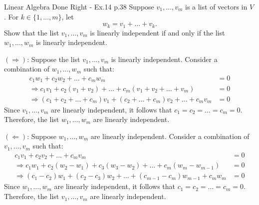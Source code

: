 \begin{problem}{}{}{Linear Algebra Done Right - Ex.14 p.38}
Suppose $v_1, \dots, v_m$ is a list of vectors in $V$.
For $k \in \{1, \dots, m\}$, let
$$w_k = v_1 + \dots + v_k.$$
Show that the list $v_1, \dots, v_m$ is linearly independent
if and only if the list $w_1, \dots, w_m$ is linearly independent.
\end{problem}

\begin{solution}
    $(\Rightarrow)$: Suppose the list $v_1, \dots, v_m$ is linearly independent.
    Consider a combination of $w_1, \dots, w_m$ such that:
    \begin{align*}
        c_1 w_1 + c_2 w_2 + \dots + c_m w_m                                       & = 0 \\
        \Rightarrow c_1 v_1 + c_2(v_1+v_2) + \dots + c_m(v_1+v_2+\dots+v_m)       & = 0 \\
        \Rightarrow (c_1+c_2+\dots+c_m)v_1 + (c_2+\dots+c_m)v_2 + \dots + c_m v_m & = 0
    \end{align*}
    Since $v_1, \dots, v_m$ are linearly independent, it follows that
    $c_1 = c_2 = \dots = c_m = 0$.
    Therefore, the list $w_1, \dots, w_m$ are linearly independent.

    $(\Leftarrow)$: Suppose $w_1, \dots, w_m$ are linearly independent.
    Consider a combination of $v_1, \dots, v_m$ such that:
    \begin{align*}
        c_1 v_1 + c_2 v_2 + \dots + c_m v_m & = 0 \\
        \Rightarrow c_1 w_1 + c_2(w_2 - w_1) + c_3(w_3 - w_2) + \dots
        + c_m(w_m - w_{m-1})                & = 0 \\
        \Rightarrow (c_1 - c_2)w_1 + (c_2 - c_3)w_2 + \dots
        + (c_{m-1} - c_m)w_{m-1} + c_m w_m  & = 0
    \end{align*}
    Since $w_1, \dots, w_m$ are linearly independent, it follows that
    $c_1 = c_2 = \dots = c_m = 0$.
    Therefore, the list $v_1, \dots, v_m$ are linearly independent.
\end{solution}